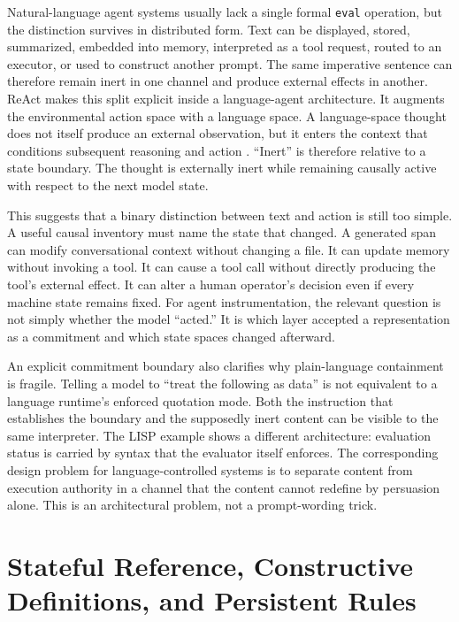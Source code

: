 \documentclass[11pt]{article}
\begin{document}
Natural-language agent systems usually lack a single formal \texttt{eval} operation, but the distinction survives in distributed form. Text can be displayed, stored, summarized, embedded into memory, interpreted as a tool request, routed to an executor, or used to construct another prompt. The same imperative sentence can therefore remain inert in one channel and produce external effects in another. ReAct makes this split explicit inside a language-agent architecture. It augments the environmental action space with a language space. A language-space thought does not itself produce an external observation, but it enters the context that conditions subsequent reasoning and action \citep{yao2023react}. ``Inert'' is therefore relative to a state boundary. The thought is externally inert while remaining causally active with respect to the next model state.

This suggests that a binary distinction between text and action is still too simple. A useful causal inventory must name the state that changed. A generated span can modify conversational context without changing a file. It can update memory without invoking a tool. It can cause a tool call without directly producing the tool's external effect. It can alter a human operator's decision even if every machine state remains fixed. For agent instrumentation, the relevant question is not simply whether the model ``acted.'' It is which layer accepted a representation as a commitment and which state spaces changed afterward.

An explicit commitment boundary also clarifies why plain-language containment is fragile. Telling a model to ``treat the following as data'' is not equivalent to a language runtime's enforced quotation mode. Both the instruction that establishes the boundary and the supposedly inert content can be visible to the same interpreter. The LISP example shows a different architecture: evaluation status is carried by syntax that the evaluator itself enforces. The corresponding design problem for language-controlled systems is to separate content from execution authority in a channel that the content cannot redefine by persuasion alone. This is an architectural problem, not a prompt-wording trick.

\section{Stateful Reference, Constructive Definitions, and Persistent Rules}
\end{document}
